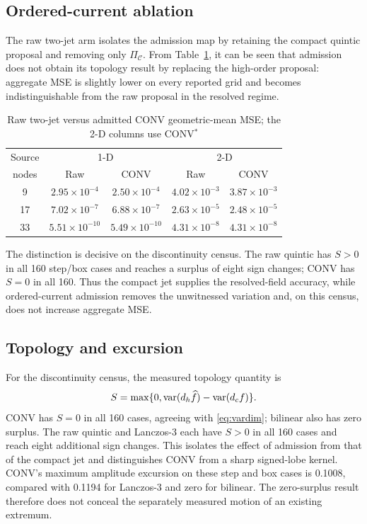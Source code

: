 \subsection{Ordered-current ablation}

The raw two-jet arm isolates the admission map by retaining the compact
quintic proposal and removing only \(\Pi_{\mathcal C}\). From
Table~\ref{tab:projectionablation}, it can be seen that admission does not
obtain its topology result by replacing the high-order proposal: aggregate
MSE is slightly lower on every reported grid and becomes indistinguishable
from the raw proposal in the resolved regime.

\begin{table}[H]
\caption{Raw two-jet versus admitted CONV geometric-mean MSE; the 2-D columns use CONV$^{*}$}
\label{tab:projectionablation}
\centering
\scriptsize
\setlength{\tabcolsep}{4.0pt}
\begin{tabular}{c|cc|cc}
\hline
Source & \multicolumn{2}{c|}{1-D} & \multicolumn{2}{c}{2-D} \\
nodes & Raw & CONV & Raw & CONV \\
\hline
9  & $2.95\!\times\!10^{-4}$ & $2.50\!\times\!10^{-4}$ &
     $4.02\!\times\!10^{-3}$ & $3.87\!\times\!10^{-3}$ \\
17 & $7.02\!\times\!10^{-7}$ & $6.88\!\times\!10^{-7}$ &
     $2.63\!\times\!10^{-5}$ & $2.48\!\times\!10^{-5}$ \\
33 & $5.51\!\times\!10^{-10}$ & $5.49\!\times\!10^{-10}$ &
     $4.31\!\times\!10^{-8}$ & $4.31\!\times\!10^{-8}$ \\
\hline
\end{tabular}
\end{table}

The distinction is decisive on the discontinuity census. The raw quintic
has \(S>0\) in all 160 step/box cases and reaches a surplus of eight sign
changes; CONV has \(S=0\) in all 160. Thus the compact jet supplies the
resolved-field accuracy, while ordered-current admission removes the
unwitnessed variation and, on this census, does not increase aggregate MSE.

\subsection{Topology and excursion}

For the discontinuity census, the measured topology quantity is
\begin{equation}
 S=\max\{0,\operatorname{var}(d_h\widehat f)-\operatorname{var}(d_cf)\}.
 \label{eq:measuredsurplus}
\end{equation}
CONV has $S=0$ in all 160 cases, agreeing with
\eqref{eq:vardim}; bilinear also has zero surplus. The raw quintic and
Lanczos-3 each have $S>0$ in all 160 cases and reach eight additional sign
changes. This isolates the effect of admission from that of the compact jet
and distinguishes CONV from a sharp signed-lobe kernel.
CONV's maximum amplitude excursion on these step and box cases is 0.1008,
compared with 0.1194 for Lanczos-3 and zero for bilinear. The zero-surplus
result therefore does not conceal the separately measured motion of an
existing extremum.

